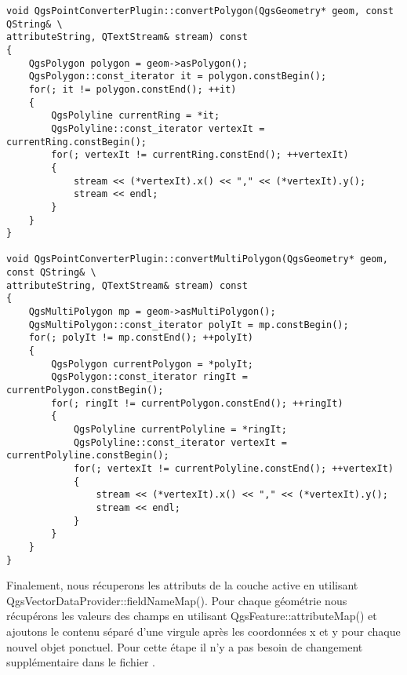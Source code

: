 \begin{verbatim}
void QgsPointConverterPlugin::convertPolygon(QgsGeometry* geom, const QString& \
attributeString, QTextStream& stream) const
{
    QgsPolygon polygon = geom->asPolygon();
    QgsPolygon::const_iterator it = polygon.constBegin();
    for(; it != polygon.constEnd(); ++it)
    {
        QgsPolyline currentRing = *it;
        QgsPolyline::const_iterator vertexIt = currentRing.constBegin();
        for(; vertexIt != currentRing.constEnd(); ++vertexIt)
        {
            stream << (*vertexIt).x() << "," << (*vertexIt).y();
            stream << endl;
        }
    }
}

void QgsPointConverterPlugin::convertMultiPolygon(QgsGeometry* geom, const QString& \
attributeString, QTextStream& stream) const
{
    QgsMultiPolygon mp = geom->asMultiPolygon();
    QgsMultiPolygon::const_iterator polyIt = mp.constBegin();
    for(; polyIt != mp.constEnd(); ++polyIt)
    {
        QgsPolygon currentPolygon = *polyIt;
        QgsPolygon::const_iterator ringIt = currentPolygon.constBegin();
        for(; ringIt != currentPolygon.constEnd(); ++ringIt)
        {
            QgsPolyline currentPolyline = *ringIt;
            QgsPolyline::const_iterator vertexIt = currentPolyline.constBegin();
            for(; vertexIt != currentPolyline.constEnd(); ++vertexIt)
            {
                stream << (*vertexIt).x() << "," << (*vertexIt).y();
                stream << endl;
            }
        }
    }
}
\end{verbatim}


Finalement, nous r\'ecuperons les attributs de la couche active en utilisant 
QgsVectorDataProvider::fieldNameMap(). Pour chaque g\'eom\'etrie nous r\'ecup\'erons les 
valeurs des champs en utilisant QgsFeature::attributeMap() et ajoutons le 
contenu s\'epar\'e d'une virgule apr\`es les coordonn\'ees x et y pour chaque nouvel 
objet ponctuel. Pour cette \'etape il n'y a pas besoin de changement suppl\'ementaire
 dans le fichier \filename{qgspointconverterplugin.h}.

